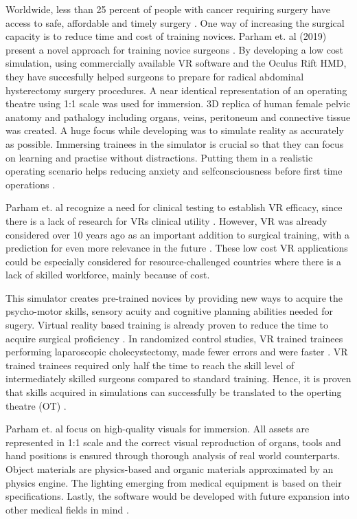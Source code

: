 Worldwide, less than 25 percent of people with cancer requiring surgery have access to safe, affordable and timely surgery \cite{RN52}.
One way of increasing the surgical capacity is to reduce time and cost of training novices.
Parham et. al (2019) present a novel approach for training novice surgeons \cite{RN52}.
By developing a low cost simulation, using commercially available VR software and the Oculus Rift HMD, they have succesfully 
helped surgeons to prepare for radical abdominal hysterectomy surgery procedures.
A near identical representation of an operating theatre using 1:1 scale was used for immersion.
3D replica of human female pelvic anatomy and pathalogy including organs, veins, peritoneum and connective tissue was created.
A huge focus while developing was to simulate reality as accurately as possible. 
Immersing trainees in the simulator is crucial so that they can focus on learning and practise without distractions.
Putting them in a realistic operating scenario helps reducing anxiety and selfconsciousness before first time operations \cite{RN52}.

Parham et. al recognize a need for clinical testing to establish VR efficacy, since there is a lack of research for VRs clinical utility \cite{RN59}. 
However, VR was already considered over 10 years ago as an important addition to surgical training, with a prediction for even more relevance in the future \cite{RN60}.
These low cost VR applications could be especially considered for resource-challenged countries where there is a lack of skilled workforce, mainly because of cost.

This simulator creates pre-trained novices by providing new ways to acquire the psycho-motor skills, sensory acuity and cognitive planning abilities needed for sugery.
Virtual reality based training is already proven to reduce the time to acquire surgical proficiency \cite{RN61,RN62}. 
In randomized control studies, VR trained trainees performing laparoscopic cholecystectomy, made fewer errors and were faster \cite{RN63,RN64}.
VR trained trainees required only half the time to reach the skill level of intermediately skilled surgeons compared to standard training.
Hence, it is proven that skills acquired in simulations can successfully be translated to the operting theatre (OT) \cite{RN63,RN64}.

Parham et. al focus on high-quality visuals for immersion.
All assets are represented in 1:1 scale and the correct visual reproduction of organs, tools and hand positions is ensured through thorough analysis of real world counterparts.
Object materials are physics-based and organic materials approximated by an physics engine.
The lighting emerging from medical equipment is based on their specifications.
Lastly, the software would be developed with future expansion into other medical fields in mind \cite{RN52}.

